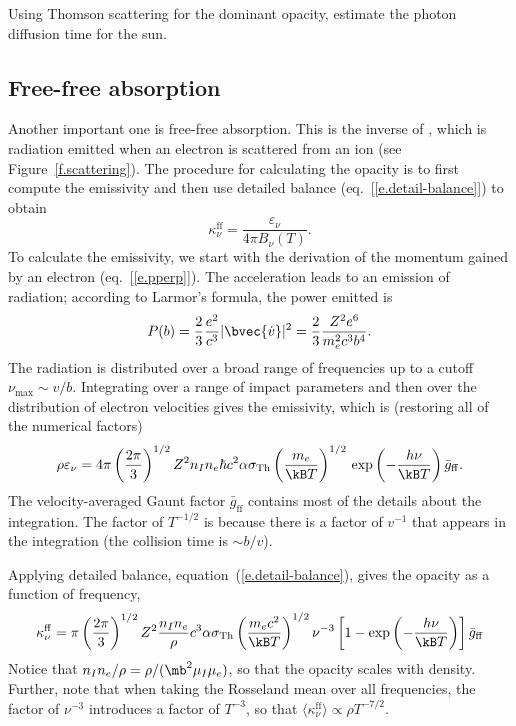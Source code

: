 \begin{exercisebox}
Using Thomson scattering for the dominant opacity, estimate the photon diffusion time for the sun. 
\end{exercisebox}

\subsection{Free-free absorption}
Another important one is free-free absorption. This is the inverse of , which is radiation emitted when an electron is scattered from an ion (see Figure~\ref{f.scattering}). The procedure for calculating the opacity is to first compute the emissivity and then use detailed balance (eq.~[\ref{e.detail-balance}]) to obtain
\[ \kappa_{\nu}^{\mathrm{ff}} = \frac{\varepsilon_{\nu}}{4\pi B_{\nu}(T)} . \] 
To calculate the emissivity, we start with the derivation of the momentum gained by an electron (eq.~[\ref{e.pperp}]).  The acceleration leads to an emission of radiation; according to Larmor's formula, the power emitted is
\begin{equation}\label{e.larmor}
P(b) = \frac{2}{3}\frac{e^{2}}{c^{3}} |\bvec{\dot{v}}|^{2} = \frac{2}{3}\frac{Z^{2}e^{6}}{m_{e}^{2}c^{3}b^{4}}.
\end{equation}
The radiation is distributed over a broad range of frequencies up to a cutoff $\nu_{\max}\sim v/b$. Integrating over a range of impact parameters and then over the distribution of electron velocities gives the emissivity, which is (restoring all of the numerical factors)
\begin{equation}\label{e.free-free-w}
\rho \varepsilon_{\nu} = 4\pi\left(\frac{2\pi}{3}\right)^{1/2}Z^{2}n_{I}n_{e} \hbar c^{2}  \alpha \sigma_{\mathrm{Th}} \left(\frac{m_{e}}{\kB T}\right)^{1/2}\,\exp\left(-\frac{h\nu}{\kB T}\right) \bar{g}_{\mathrm{ff}}.
\end{equation}
The velocity-averaged Gaunt factor $\bar{g}_{\mathrm{ff}}$ contains most of the details about the integration. The factor of $T^{-1/2}$ is because there is a factor of $v^{-1}$ that appears in the integration (the collision time is $\sim b/v$).  

Applying detailed balance, equation~(\ref{e.detail-balance}), gives the opacity as a function of frequency,
\begin{equation}\label{e.free-free-opacity}
\kappa^{\mathrm{ff}}_{\nu} = \pi\left(\frac{2\pi}{3}\right)^{1/2}Z^{2}\frac{n_{I}n_{e}}{\rho}c^{3}\alpha \sigma_{\mathrm{Th}} \left(\frac{m_{e}c^{2}}{\kB T}\right)^{1/2} \nu^{-3} \left[ 1- \exp\left(-\frac{h\nu}{\kB T}\right)  \right] \bar{g}_{\mathrm{ff}}
\end{equation}
Notice that $n_{I}n_{e}/\rho = \rho/(\mb^{2}\mu_{I}\mu_{e})$, so that the opacity scales with density.  Further, note that when taking the Rosseland mean over all frequencies, the factor of $\nu^{-3}$ introduces a factor of $T^{-3}$, so that $\langle\kappa^{\mathrm{ff}}_{\nu}\rangle \propto \rho T^{-7/2}$.

